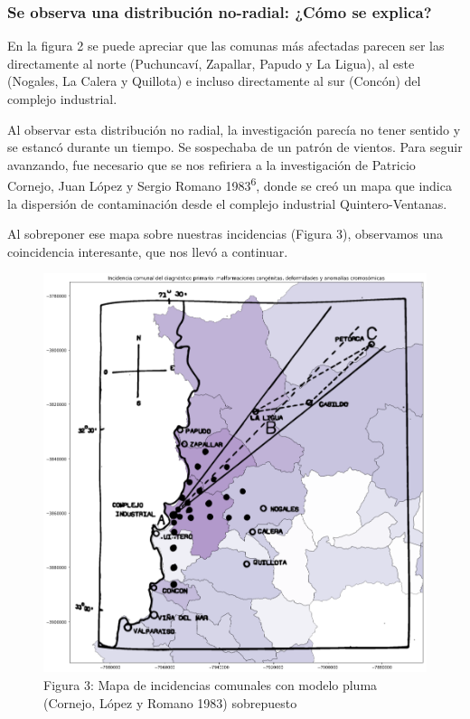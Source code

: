 \documentclass[]{article}
\begin{document}
\hypertarget{se-observa-una-distribuciuxf3n-no-radial-cuxf3mo-se-explica}{%
\subsubsection{Se observa una distribución no-radial: ¿Cómo se
explica?}\label{se-observa-una-distribuciuxf3n-no-radial-cuxf3mo-se-explica}}

En la figura 2 se puede apreciar que las comunas más afectadas parecen
ser las directamente al norte (Puchuncaví, Zapallar, Papudo y La Ligua),
al este (Nogales, La Calera y Quillota) e incluso directamente al sur
(Concón) del complejo industrial.

Al observar esta distribución no radial, la investigación parecía no
tener sentido y se estancó durante un tiempo. Se sospechaba de un patrón
de vientos. Para seguir avanzando, fue necesario que se nos refiriera a
la investigación de Patricio Cornejo, Juan López y Sergio Romano
1983\textsuperscript{{6}}, donde se creó un mapa que indica la
dispersión de contaminación desde el complejo industrial
Quintero-Ventanas.

Al sobreponer ese mapa sobre nuestras incidencias (Figura 3), observamos
una coincidencia interesante, que nos llevó a continuar.

\begin{figure}
\centering
\includegraphics{assets/mapa-pluma.png}
\caption{Figura 3: Mapa de incidencias comunales con modelo pluma (Cornejo, López y Romano 1983)
sobrepuesto}
\end{figure}
\end{document}
